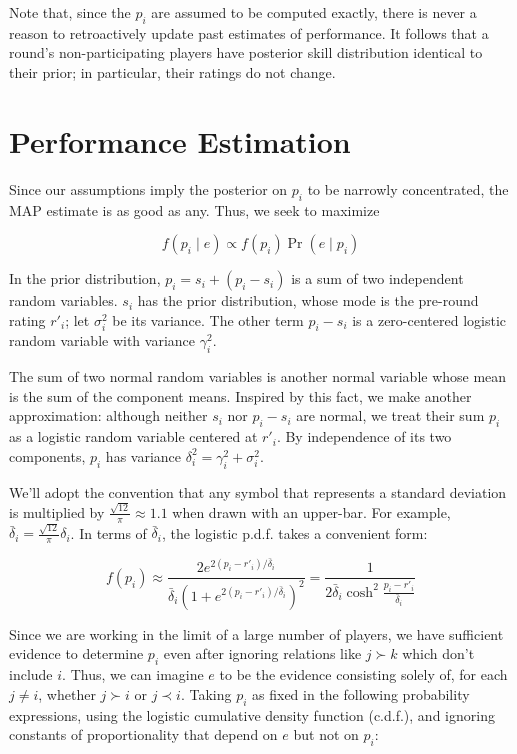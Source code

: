 \documentclass{article}
\begin{document}
Note that, since the $p_i$ are assumed to be computed exactly, there is never a reason to retroactively update past estimates of performance. It follows that a round's non-participating players have posterior skill distribution identical to their prior; in particular, their ratings do not change.

\section{Performance Estimation}

Since our assumptions imply the posterior on $p_i$ to be narrowly concentrated, the MAP estimate is as good as any. Thus, we seek to maximize

\[f(p_i\mid e) \propto f(p_i) \Pr(e\mid p_i)\]

In the prior distribution, $p_i = s_i + (p_i-s_i)$ is a sum of two independent random variables. $s_i$ has the prior distribution, whose mode is the pre-round rating $r'_i$; let $\sigma_i^2$ be its variance. The other term $p_i-s_i$ is a zero-centered logistic random variable with variance $\gamma_i^2$.

The sum of two normal random variables is another normal variable whose mean is the sum of the component means. Inspired by this fact, we make another approximation: although neither $s_i$ nor $p_i-s_i$ are normal, we treat their sum $p_i$ as a logistic random variable centered at $r'_i$. By independence of its two components, $p_i$ has variance $\delta_i^2 = \gamma_i^2 + \sigma_i^2$.

We'll adopt the convention that any symbol that represents a standard deviation is multiplied by $\frac{\sqrt{12}}{\pi}\approx 1.1$ when drawn with an upper-bar. For example, $\bar\delta_i = \frac{\sqrt{12}}{\pi} \delta_i$. In terms of $\bar\delta_i$, the logistic p.d.f. takes a convenient form:

\[
f(p_i)
\approx \frac { 2e^{2(p_i-r'_i)/\bar\delta_i} } { \bar\delta_i\left( 1 + e^{2(p_i-r'_i)/\bar\delta_i} \right)^2}
= \frac { 1 } { 2\bar\delta_i \cosh^2\frac{p_i-r'_i}{\bar\delta_i} }
\]

Since we are working in the limit of a large number of players, we have sufficient evidence to determine $p_i$ even after ignoring relations like $j \succ k$ which don't include $i$. Thus, we can imagine $e$ to be the evidence consisting solely of, for each $j\ne i$, whether $j \succ i$ or $j \prec i$. Taking $p_i$ as fixed in the following probability expressions, using the logistic cumulative density function (c.d.f.), and ignoring constants of proportionality that depend on $e$ but not on $p_i$:
\end{document}
